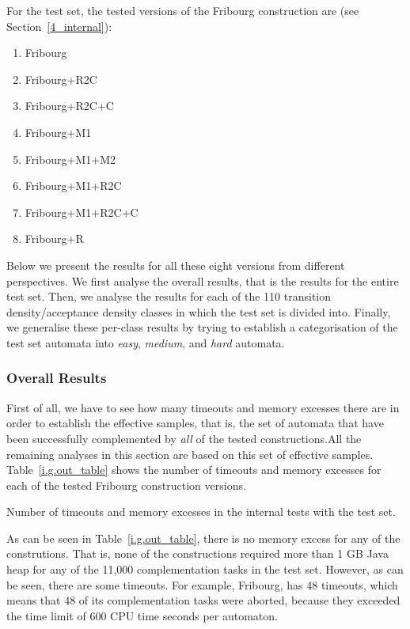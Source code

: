 For the \goal{} test set, the tested versions of the Fribourg construction are (see Section~\ref{4_internal}):
\begin{enumerate}
\item Fribourg
\item Fribourg+R2C
\item Fribourg+R2C+C
\item Fribourg+M1
\item Fribourg+M1+M2
\item Fribourg+M1+R2C
\item Fribourg+M1+R2C+C
\item Fribourg+R
\end{enumerate}

Below we present the results for all these eight versions from different perspectives. We first analyse the overall results, that is the results for the entire test set. Then, we analyse the results for each of the 110 transition density/acceptance density classes in which the \goal{} test set is divided into. Finally, we generalise these per-class results by trying to establish a categorisation of the \goal{} test set automata into \textit{easy}, \textit{medium}, and \textit{hard} automata.

\subsubsection{Overall Results}
First of all, we have to see how many timeouts and memory excesses there are in order to establish the effective samples, that is, the set of automata that have been successfully complemented by \textit{all} of the tested constructions.All the remaining analyses in this section are based on this set of effective samples. Table~\ref{i.g.out_table} shows the number of timeouts and memory excesses for each of the tested Fribourg construction versions.

\begin{table}[ht]
\centering

\caption{Number of timeouts and memory excesses in the internal tests with the \goal{} test set.}
\label{i.g.out_table}
\end{table}

As can be seen in Table~\ref{i.g.out_table}, there is no memory excess for any of the construtions. That is, none of the constructions required more than 1 GB Java heap for any of the 11,000 complementation tasks in the \goal{} test set. However, as can be seen, there are some timeouts. For example, Fribourg, has 48 timeouts, which means that 48 of its complementation tasks were aborted, because they exceeded the time limit of 600 CPU time seconds per automaton.

